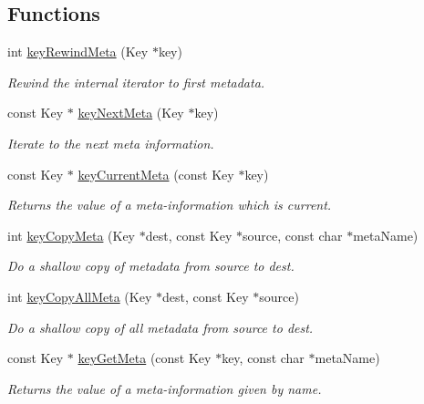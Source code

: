 \subsection*{Functions}
\begin{DoxyCompactItemize}
\item 
int \mbox{\hyperlink{group__keymeta_ga5dbb669802eea27e106ee3a5e39717a9}{key\+Rewind\+Meta}} (Key $\ast$key)
\begin{DoxyCompactList}\small\item\em Rewind the internal iterator to first metadata. \end{DoxyCompactList}\item 
const Key $\ast$ \mbox{\hyperlink{group__keymeta_ga4c88342f580a4291455a801af71ce048}{key\+Next\+Meta}} (Key $\ast$key)
\begin{DoxyCompactList}\small\item\em Iterate to the next meta information. \end{DoxyCompactList}\item 
const Key $\ast$ \mbox{\hyperlink{group__keymeta_ga74a273f529030f4947df52e14fdd2869}{key\+Current\+Meta}} (const Key $\ast$key)
\begin{DoxyCompactList}\small\item\em Returns the value of a meta-\/information which is current. \end{DoxyCompactList}\item 
int \mbox{\hyperlink{group__keymeta_ga9a22b992478e613c8788bd460b4a1f0c}{key\+Copy\+Meta}} (Key $\ast$dest, const Key $\ast$source, const char $\ast$meta\+Name)
\begin{DoxyCompactList}\small\item\em Do a shallow copy of metadata from source to dest. \end{DoxyCompactList}\item 
int \mbox{\hyperlink{group__keymeta_ga8e63720a65610a29597494d0671f9401}{key\+Copy\+All\+Meta}} (Key $\ast$dest, const Key $\ast$source)
\begin{DoxyCompactList}\small\item\em Do a shallow copy of all metadata from source to dest. \end{DoxyCompactList}\item 
const Key $\ast$ \mbox{\hyperlink{group__keymeta_ga9ed3875495ddb3d8a8d29158a60a147c}{key\+Get\+Meta}} (const Key $\ast$key, const char $\ast$meta\+Name)
\begin{DoxyCompactList}\small\item\em Returns the value of a meta-\/information given by name. \end{DoxyCompactList}\item 

\end{DoxyCompactItemize}
